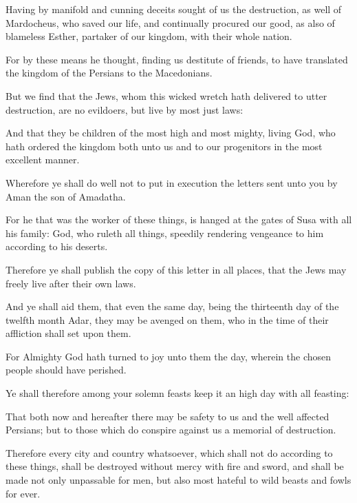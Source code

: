 {\par }{\PP {}Having by manifold and cunning deceits sought of us the destruction, as well of Mardocheus, who saved our life, and continually procured our good, as also of blameless Esther, partaker of our kingdom, with their whole nation.
\par }{\PP {}For by these means he thought, finding us destitute of friends, to have translated the kingdom of the Persians to the Macedonians.
\par }{\PP {}But we find that the Jews, whom this wicked wretch hath delivered to utter destruction, are no evildoers, but live by most just laws:
\par }{\PP {}And that they be children of the most high and most mighty, living God, who hath ordered the kingdom both unto us and to our progenitors in the most excellent manner.
\par }{\PP {}Wherefore ye shall do well not to put in execution the letters sent unto you by Aman the son of Amadatha.
\par }{\PP {}For he that was the worker of these things, is hanged at the gates of Susa with all his family: God, who ruleth all things, speedily rendering vengeance to him according to his deserts.
\par }{\PP {}Therefore ye shall publish the copy of this letter in all places, that the Jews may freely live after their own laws.
\par }{\PP {}And ye shall aid them, that even the same day, being the thirteenth day of the twelfth month Adar, they may be avenged on them, who in the time of their affliction shall set upon them.
\par }{\PP {}For Almighty God hath turned to joy unto them the day, wherein the chosen people should have perished.
\par }{\PP {}Ye shall therefore among your solemn feasts keep it an high day with all feasting:
\par }{\PP {}That both now and hereafter there may be safety to us and the well affected Persians; but to those which do conspire against us a memorial of destruction.
\par }{\PP {}Therefore every city and country whatsoever, which shall not do according to these things, shall be destroyed without mercy with fire and sword, and shall be made not only unpassable for men, but also most hateful to wild beasts and fowls for ever.
\par }